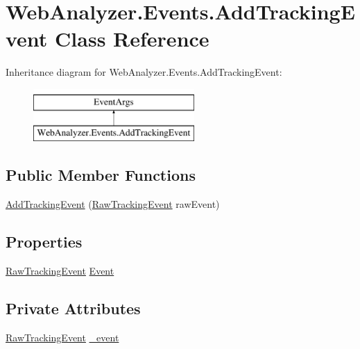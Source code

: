 \hypertarget{class_web_analyzer_1_1_events_1_1_add_tracking_event}{}\section{Web\+Analyzer.\+Events.\+Add\+Tracking\+Event Class Reference}
\label{class_web_analyzer_1_1_events_1_1_add_tracking_event}
Inheritance diagram for Web\+Analyzer.\+Events.\+Add\+Tracking\+Event\+:\begin{figure}[H]
\begin{center}
\leavevmode
\includegraphics[height=2.000000cm]{class_web_analyzer_1_1_events_1_1_add_tracking_event}
\end{center}
\end{figure}
\subsection*{Public Member Functions}
\begin{DoxyCompactItemize}
\item 
\hyperlink{class_web_analyzer_1_1_events_1_1_add_tracking_event_aa6bdf6822e677603f63c38f8f25b4173}{Add\+Tracking\+Event} (\hyperlink{class_web_analyzer_1_1_models_1_1_base_1_1_raw_tracking_event}{Raw\+Tracking\+Event} raw\+Event)
\end{DoxyCompactItemize}
\subsection*{Properties}
\begin{DoxyCompactItemize}
\item 
\hyperlink{class_web_analyzer_1_1_models_1_1_base_1_1_raw_tracking_event}{Raw\+Tracking\+Event} \hyperlink{class_web_analyzer_1_1_events_1_1_add_tracking_event_aac855bc1f8abb62af8501d10be516dd2}{Event}
\end{DoxyCompactItemize}
\subsection*{Private Attributes}
\begin{DoxyCompactItemize}
\item 
\hyperlink{class_web_analyzer_1_1_models_1_1_base_1_1_raw_tracking_event}{Raw\+Tracking\+Event} \hyperlink{class_web_analyzer_1_1_events_1_1_add_tracking_event_ae4254416e365751f3187a64e68ff4fc2}{\+\_\+event}
\end{DoxyCompactItemize}


